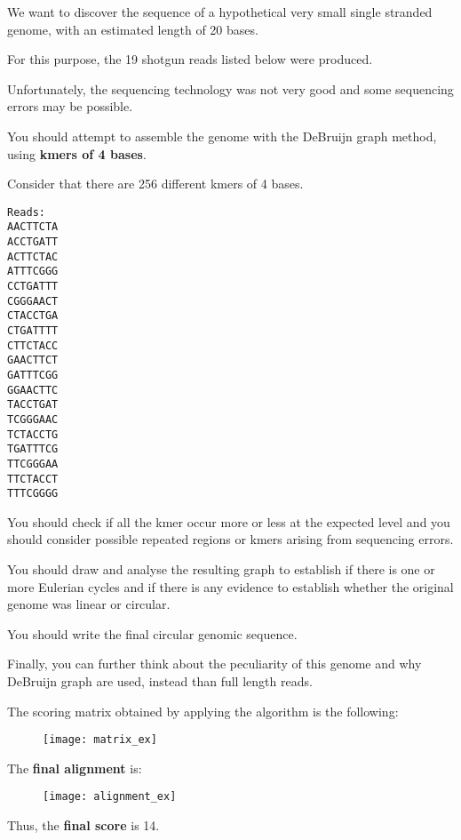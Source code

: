 \begin{Exercise} [
  title={DeBruijn assembly},
  difficulty={2},
  label={exA},
  origin={G. Valle}
 ]

We want to discover the sequence of a hypothetical very small single stranded
genome, with an estimated length of 20 bases.

For this purpose, the 19 shotgun reads listed below were produced.

Unfortunately, the sequencing technology was not very good and some sequencing
errors may be possible.

You should attempt to assemble the genome with the DeBruijn graph method,
using \textbf{kmers of 4 bases}.

Consider that there are 256 different kmers of 4 bases.

\begin{verbatim}
Reads:
AACTTCTA
ACCTGATT
ACTTCTAC
ATTTCGGG
CCTGATTT
CGGGAACT
CTACCTGA
CTGATTTT
CTTCTACC
GAACTTCT
GATTTCGG
GGAACTTC
TACCTGAT
TCGGGAAC
TCTACCTG
TGATTTCG
TTCGGGAA
TTCTACCT
TTTCGGGG
\end{verbatim}


  \Question You should check if all the kmer occur more or less at the expected
level and you should consider possible repeated regions or kmers arising from
sequencing errors.

  \Question You should draw and analyse the resulting graph to establish if
there is one or more Eulerian cycles and if there is any evidence to establish
whether the original genome was linear or circular.

  \Question You should write the final circular genomic sequence.

Finally, you can further think about the peculiarity of this genome and why
DeBruijn graph are used, instead than full length reads.
\end{Exercise}


\newpage

\begin{Answer} [
  ref={exSW},
  number={4}
 ]

 The scoring matrix obtained by applying the algorithm is the following:

 \begin{figure}[H]
  \centering
  \texttt{[image: matrix\_ex]}
 \end{figure}

 The \textbf{final alignment} is:

 \begin{figure}[H]
  \centering
  \texttt{[image: alignment\_ex]}
 \end{figure}

 Thus, the \textbf{final score} is 14.

\end{Answer}

